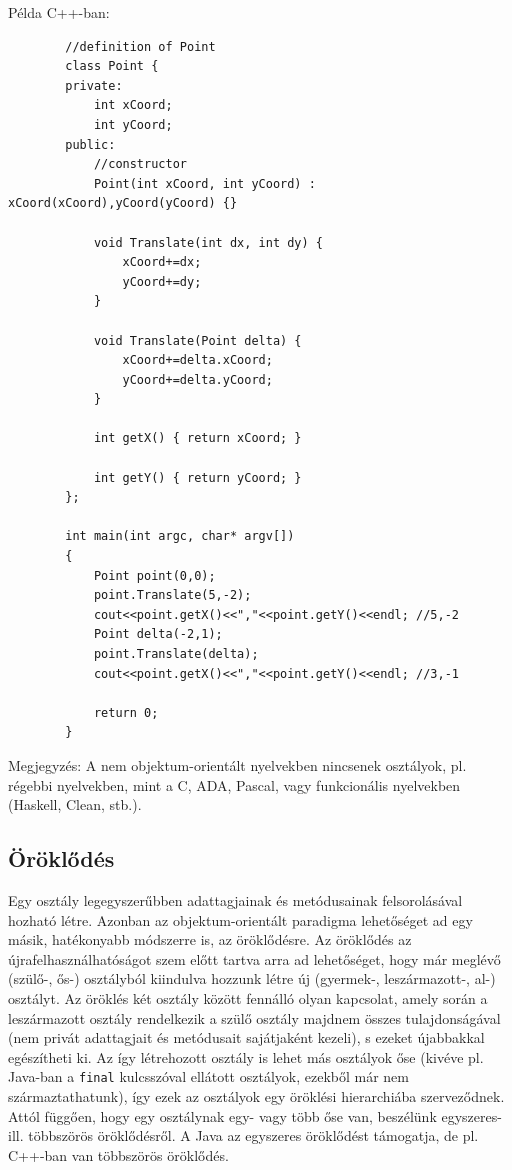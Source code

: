 \documentclass[margin=0px]{article}
\begin{document}
\noindent Példa C++-ban:
\begin{verbatim}
        //definition of Point
        class Point {
        private:
            int xCoord;
            int yCoord;
        public:
            //constructor
            Point(int xCoord, int yCoord) : xCoord(xCoord),yCoord(yCoord) {}
            
            void Translate(int dx, int dy) {
                xCoord+=dx;
                yCoord+=dy;
            }
            
            void Translate(Point delta) {
                xCoord+=delta.xCoord;
                yCoord+=delta.yCoord;
            }
            
            int getX() { return xCoord; }
            
            int getY() { return yCoord; }
        };
        
        int main(int argc, char* argv[])
        {
            Point point(0,0);
            point.Translate(5,-2);
            cout<<point.getX()<<","<<point.getY()<<endl; //5,-2
            Point delta(-2,1);
            point.Translate(delta);
            cout<<point.getX()<<","<<point.getY()<<endl; //3,-1
            
            return 0;
        }
        \end{verbatim}

Megjegyzés: A nem objektum-orientált nyelvekben nincsenek osztályok, pl. régebbi nyelvekben, mint a C, ADA, Pascal, vagy
funkcionális nyelvekben (Haskell, Clean, stb.).

\subsection{Öröklődés}

Egy osztály legegyszerűbben adattagjainak és metódusainak felsorolásával hozható létre. Azonban az objektum-orientált paradigma lehetőséget ad egy másik, hatékonyabb módszerre is, az öröklődésre. Az öröklődés az újrafelhasználhatóságot szem előtt tartva arra ad lehetőséget, hogy már meglévő (szülő-, ős-) osztályból kiindulva hozzunk létre új (gyermek-, leszármazott-, al-) osztályt. Az öröklés két osztály között fennálló olyan kapcsolat, amely során a leszármazott osztály rendelkezik a szülő osztály majdnem összes tulajdonságával (nem privát adattagjait és metódusait sajátjaként kezeli), s ezeket újabbakkal egészítheti ki. Az így létrehozott osztály is lehet más osztályok őse (kivéve pl. Java-ban a \texttt{final} kulcsszóval ellátott osztályok, ezekből már nem származtathatunk), így ezek az osztályok egy öröklési hierarchiába szerveződnek. Attól függően, hogy egy osztálynak egy- vagy több őse van, beszélünk egyszeres- ill. többszörös öröklődésről. A Java az egyszeres öröklődést támogatja, de pl. C++-ban van többszörös öröklődés.
\end{document}
